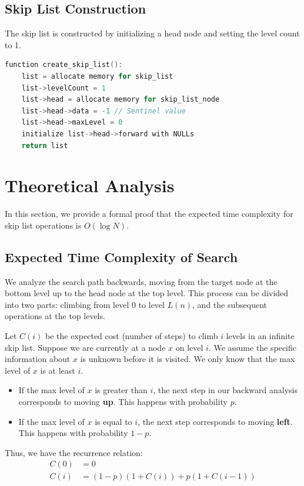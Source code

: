 \documentclass[a4paper,12pt]{article}
\begin{document}
\subsection{Skip List Construction}
The skip list is constructed by initializing a head node and setting the level count to 1.

\begin{lstlisting}[language=C]
function create_skip_list():
    list = allocate memory for skip_list
    list->levelCount = 1
    list->head = allocate memory for skip_list_node
    list->head->data = -1 // Sentinel value
    list->head->maxLevel = 0
    initialize list->head->forward with NULLs
    return list
\end{lstlisting}

\section{Theoretical Analysis}
In this section, we provide a formal proof that the expected time complexity for skip list operations is $O(\log N)$.

\subsection{Expected Time Complexity of Search}
We analyze the search path backwards, moving from the target node at the bottom level up to the head node at the top level. This process can be divided into two parts: climbing from level 0 to level $L(n)$, and the subsequent operations at the top levels.

Let $C(i)$ be the expected cost (number of steps) to climb $i$ levels in an infinite skip list.
Suppose we are currently at a node $x$ on level $i$. We assume the specific information about $x$ is unknown before it is visited. We only know that the max level of $x$ is at least $i$.
\begin{itemize}
    \item If the max level of $x$ is greater than $i$, the next step in our backward analysis corresponds to moving \textbf{up}. This happens with probability $p$.
    \item If the max level of $x$ is equal to $i$, the next step corresponds to moving \textbf{left}. This happens with probability $1-p$.
\end{itemize}

Thus, we have the recurrence relation:
\begin{align*}
C(0) &= 0 \\
C(i) &= (1-p)(1 + C(i)) + p(1 + C(i-1))
\end{align*}
\end{document}

